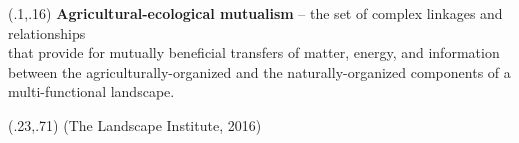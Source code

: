 \documentclass[
paper=128mm:96mm, %
fontsize=11pt, %
pagesize, %
parskip=half-, %
]{scrartcl}
\theoremstyle{mythmstyle} %
\begin{document}
\begin{textblock}{1}(.1,.16)
\textbf{Agricultural-ecological mutualism} -- the set of complex linkages and relationships \\
that provide for mutually beneficial transfers of matter, energy, and information \\
between the agriculturally-organized and the naturally-organized components of a \\
multi-functional landscape.
\end{textblock}

 
 \begin{textblock}{1}(.23,.71)
  \small {(The Landscape Institute, 2016)}
 \end{textblock}

\clearpage




\end{document}
